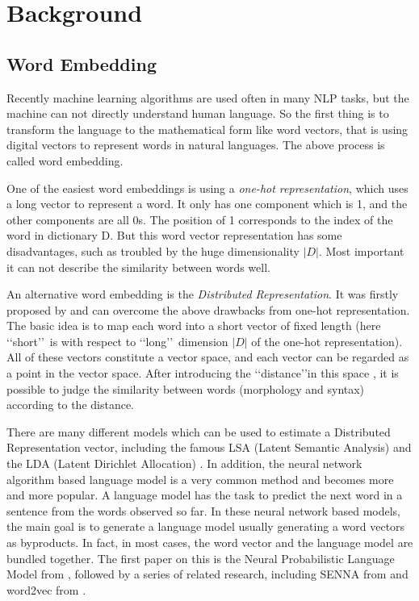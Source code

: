 \chapter{Background}
\label{cha:background}


\section{Word Embedding}
Recently machine learning algorithms are used often in many NLP tasks, but the machine can not directly understand human language. So the first thing is to transform the language to the mathematical form like word vectors, that is using digital vectors to represent words in natural languages. The above process is called word embedding. 

One of the easiest word embeddings is using a \emph{one-hot representation}, which uses a long vector to represent a word. It only has one component which is 1, and the other components are all 0s. The position of 1 corresponds to the index of the word in dictionary \gls{D}. But this word vector representation has some disadvantages, such as troubled by the huge dimensionality $|D|$. Most important it can not describe the similarity between words well. 

An alternative word embedding is the \emph{Distributed Representation}. It was firstly proposed by \cite{WilliamsHinton1986} and can overcome the above drawbacks from one-hot representation. The basic idea is to map each word into a short vector of fixed length (here \lq\lq short\rq\rq\ is with respect to \lq\lq long\rq\rq\  dimension $|D|$ of the one-hot representation). All of these vectors constitute a vector space, and each vector can be regarded as a point in the vector space. After introducing the \lq\lq distance\rq\rq in this space , it is possible to judge the similarity between words (morphology and syntax) according to the distance. 

There are many different models which can be used to estimate a Distributed Representation vector, including the famous LSA (Latent Semantic Analysis) \citep{DeerwesterDumaisEtAl1990} and the LDA (Latent Dirichlet Allocation) \citep{BleiNgEtAl2003}. In addition, the neural network algorithm based language model is a very common method and becomes more and more popular. A language model has the task to predict the next word in a sentence from the words observed so far.
In these neural network based models, the main goal is to generate a language model usually generating a word vectors as byproducts. In fact, in most cases, the word vector and the language model are bundled together. The first paper on this is the Neural Probabilistic Language Model from \citep{BengioDucharmeEtAl2003}, followed by a series of related research, including SENNA from \cite{CollobertWestonEtAl2011} and word2vec from  \cite{MikolovSutskeverEtAl2013}.

